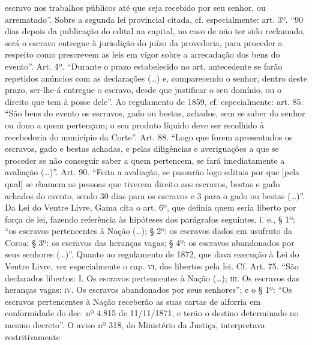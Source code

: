 {  escravo nos trabalhos públicos até que seja recebido por seu senhor,
  ou arrematado''. Sobre a segunda lei provincial citada, cf.
  especialmente: art. 3º. ``90 dias depois da publicação do edital na
  capital, no caso de não ter sido reclamado, será o escravo entregue à
  jurisdição do juízo da provedoria, para proceder a respeito como
  prescrevem as leis em vigor sobre a arrecadação dos bens do evento''.
  Art. 4º. ``Durante o prazo estabelecido no art. antecedente se farão
  repetidos anúncios com as declarações (\ldots{}) e, comparecendo o senhor,
  dentro deste prazo, ser-lhe-á entregue o escravo, desde que justificar
  o seu domínio, ou o direito que tem à posse dele''. Ao regulamento de
  1859, cf. especialmente: art. 85. ``São bens do evento os escravos,
  gado ou bestas, achados, sem se saber do senhor ou dono a quem
  pertençam; o seu produto líquido deve ser recolhido à recebedoria do
  município da Corte''. Art. 88. ``Logo que forem apresentados os escravos,
  gado e bestas achadas, e pelas diligências e averiguações a que se
  proceder se não conseguir saber a quem pertencem, se fará
  imediatamente a avaliação (\ldots{})''. Art. 90. ``Feita a avaliação, se
  passarão logo editais por que {[}pela qual{]} se chamem as pessoas que
  tiverem direito aos escravos, bestas e gado achados do evento, sendo
  30 dias para os escravos e 3 para o gado ou bestas (\ldots{})''. Da Lei do
  Ventre Livre, Gama cita o art. 6º, que definia quem seria liberto por
  força de lei, fazendo referência às hipóteses dos parágrafos
  seguintes, i. e., § 1º: ``os escravos pertencentes à Nação (\ldots{}); §
  2º: os escravos dados em usufruto da Coroa; § 3º: os escravos das
  heranças vagas; § 4º: os escravos abandonados por seus senhores
  (\ldots{})''. Quanto ao regulamento de 1872, que dava execução à Lei do
  Ventre Livre, ver especialmente o cap. \textsc{vi}, dos libertos pela lei. Cf.
  Art. 75. ``São declarados libertos: I. Os escravos pertencentes à Nação
  (\ldots{}); \textsc{iii}. Os escravos das heranças vagas; \textsc{iv}. Os escravos
  abandonados por seus senhores''; e o § 1º: ``Os escravos pertencentes à
  Nação receberão as suas cartas de alforria em conformidade do dec. nº
  4.815 de 11/11/1871, e terão o destino determinado no mesmo decreto''.
  O aviso nº 318, do Ministério da Justiça, interpretava restritivamente
}
